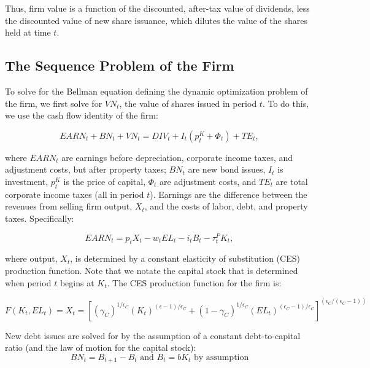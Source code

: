 Thus, firm value is a function of the discounted, after-tax value of dividends, less the discounted value of new share issuance, which dilutes the value of the shares held at time $t$. 

\subsection{The Sequence Problem of the Firm}

To solve for the Bellman equation defining the dynamic optimization problem of the firm, we first solve for $VN_{t}$, the value of shares issued in period $t$.  To do this, we use the cash flow identity of the firm: 

\begin{equation}
\label{eqn:vn}
EARN_{t}+BN_{t}+VN_{t}=DIV_{t}+I_{t}(p^{K}_{t}+\Phi_{t})+TE_{t}, 
\end{equation}

\noindent\noindent where $EARN_{t}$ are earnings before depreciation, corporate income taxes, and adjustment costs, but after property taxes; $BN_{t}$ are new bond issues, $I_{t}$ is investment, $p^{K}_{t}$ is the price of capital, $\Phi_{t}$ are adjustment costs, and $TE_{t}$ are total corporate income taxes (all in period $t$).  Earnings are the difference between the revenues from selling firm output, $X_{t}$, and the costs of labor, debt, and property taxes.  Specifically:    

\begin{equation}
\label{eqn:earn}
EARN_{t}=p_{t}X_{t}-w_{t}EL_{t}-i_{t}B_{t}-\tau^{P}_{t}K_{t},
\end{equation}

\noindent\noindent where output, $X_{t}$, is determined by a constant elasticity of substitution (CES) production function. Note that we notate the capital stock that is determined when period $t$ begins at $K_{t}$.  The CES production function for the firm is:

\begin{equation}
\label{eqn:prod_fun}
F(K_{t},EL_{t})=X_{t} = \left[(\gamma_{C})^{1/\epsilon_{C}}(K_{t})^{(\epsilon-1)/\epsilon_{C}}+(1-\gamma_{C})^{1/\epsilon_{C}}(EL_{t})^{(\epsilon_{C}-1)/\epsilon_{C}}\right]^{(\epsilon_{C}/(\epsilon_{C}-1))}
\end{equation}

New debt issues are solved for by the assumption of a constant debt-to-capital ratio (and the law of motion for the capital stock):
\begin{equation}
\label{eqn:debt}
BN_{t}=B_{t+1} - B_{t} \text{ and } B_{t}=bK_{t} \text{ by assumption} 
\end{equation}

